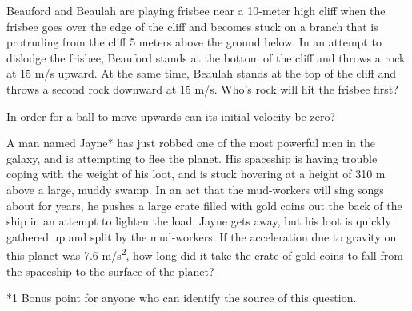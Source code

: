 \documentclass[10pt]{examdesign}
\begin{document}
\begin{multiplechoice} [title={Multiple Choice},
	rearrange=no]
\begin{question}
Beauford and Beaulah are playing frisbee near a 10-meter high cliff when the frisbee goes over the edge of the cliff and becomes stuck on a branch that is protruding from the cliff 5 meters above the ground below.  In an attempt to dislodge the frisbee, Beauford stands at the bottom of the cliff and throws a rock at 15 m/s upward.  At the same time, Beaulah stands at the top of the cliff and throws a second rock downward at 15 m/s.  Who's rock will hit the frisbee first?
	\end{question}

\begin{question}
In order for a ball to move upwards can its initial velocity be zero?

	
\end{question}


\begin{question}
A man named Jayne* has just robbed one of the most powerful men in the galaxy, and is attempting to flee the planet.  His spaceship is having trouble coping with the weight of his loot, and is stuck hovering at a height of 310 m above a large, muddy swamp.  In an act that the mud-workers will sing songs about for years, he pushes a large crate filled with gold coins out the back of the ship in an attempt to lighten the load.  Jayne gets away, but his loot is quickly gathered up and split by the mud-workers.  If the acceleration due to gravity on this planet was 7.6 m/s\textsuperscript{2}, how long did it take the crate of gold coins to fall from the spaceship to the surface of the planet?  

*1 Bonus point for anyone who can identify the source of this question.


\end{question}






\end{multiplechoice}
\end{document}
